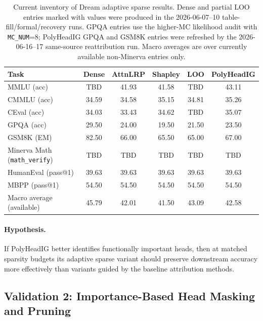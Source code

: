 \begin{table}[t]
\centering
\caption{Current inventory of Dream adaptive sparse results. Dense and partial LOO entries marked with values were produced in the 2026-06-07--10 table-fill/formal/recovery runs. GPQA entries use the higher-MC likelihood audit with \texttt{MC\_NUM}=8; PolyHeadIG GPQA and GSM8K entries were refreshed by the 2026-06-16--17 same-source reattribution run. Macro averages are over currently available non-Minerva entries only.}
\label{tab:adaptive_dream_draft}
\begin{tabular}{lccccc}
\hline
\textbf{Task} & \textbf{Dense} & \textbf{AttnLRP} & \textbf{Shapley} & \textbf{LOO} & \textbf{PolyHeadIG} \\
\hline
MMLU (acc) & TBD & 41.93 & 41.58 & TBD & 43.11 \\
CMMLU (acc) & 34.59 & 34.58 & 35.15 & 34.81 & 35.26 \\
CEval (acc) & 34.03 & 33.43 & 34.62 & TBD & 35.07 \\
GPQA (acc) & 29.50 & 24.00 & 19.50 & 21.50 & 23.50 \\
GSM8K (EM) & 82.50 & 66.00 & 65.50 & 65.00 & 67.00 \\
Minerva Math (\texttt{math\_verify}) & TBD & TBD & TBD & TBD & TBD \\
HumanEval (pass@1) & 39.63 & 39.63 & 39.63 & 39.63 & 39.63\\
MBPP (pass@1) & 54.50 & 54.50 & 54.50 & 54.50 & 54.50 \\
Macro average (available) & 45.79 & 42.01 & 41.50 & 43.09 & 42.58 \\
\hline
\end{tabular}
\end{table}


\paragraph{Hypothesis.}
If PolyHeadIG better identifies functionally important heads, then at matched sparsity budgets its adaptive sparse variant should preserve downstream accuracy more effectively than variants guided by the baseline attribution methods.

\subsection{Validation 2: Importance-Based Head Masking and Pruning}
\label{sec:exp:masking}

